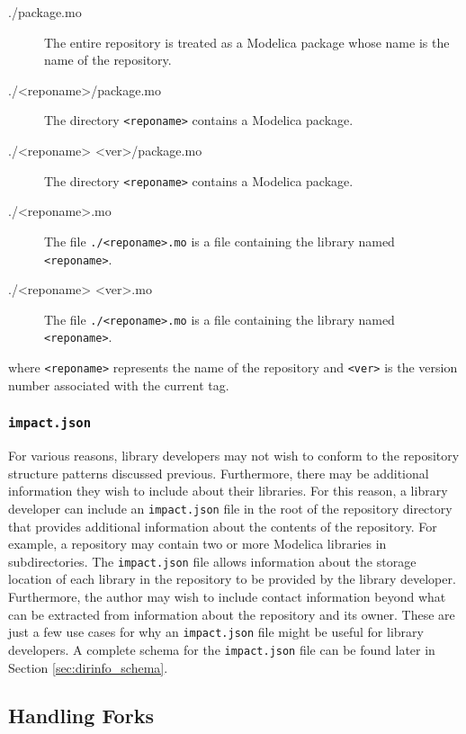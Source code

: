\documentclass[11pt,a4paper,twocolumn]{article}
\newcommand{\code}[1]{\texttt{#1}} %
\begin{document}
\begin{description}
  \item[./package.mo] The entire repository is treated as a Modelica
    package whose name is the name of the repository.

  \item[./<reponame>/package.mo] The directory \code{<reponame>}
    contains a Modelica package.

  \item[./<reponame> <ver>/package.mo] The directory \code{<reponame>}
    contains a Modelica package.

  \item[./<reponame>.mo] The file \code{./<reponame>.mo} is a file
    containing the library named \code{<reponame>}.

  \item[./<reponame> <ver>.mo] The file \code{./<reponame>.mo} is a file
    containing the library named \code{<reponame>}.
\end{description}

where \code{<reponame>} represents the name of the repository and
\code{<ver>} is the version number associated with the current tag.

\subsubsection{\code{impact.json}}
\label{sec:dirinfo}

For various reasons, library developers may not wish to conform to the
repository structure patterns discussed previous.  Furthermore, there
may be additional information they wish to include about their
libraries.  For this reason, a library developer can include an
\code{impact.json} file in the root of the repository directory that
provides additional information about the contents of the repository.
For example, a repository may contain two or more Modelica libraries
in subdirectories.  The \code{impact.json} file allows information
about the storage location of each library in the repository to be
provided by the library developer.  Furthermore, the author may wish
to include contact information beyond what can be extracted from
information about the repository and its owner.  These are just a few
use cases for why an \code{impact.json} file might be useful for
library developers.  A complete schema for the \code{impact.json} file
can be found later in Section \ref{sec:dirinfo_schema}.

\subsection{Handling Forks}
\end{document}

